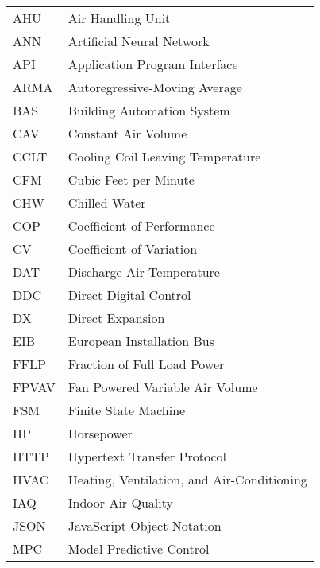 \noindent
\begin{longtable}{ll}
AHU          & Air Handling Unit\tabularnewline
ANN          & Artificial Neural Network                                 \\
API          & Application Program Interface                             \\
ARMA         & Autoregressive-Moving Average                             \\
BAS          & Building Automation System\tabularnewline
CAV          & Constant Air Volume                                       \\
CCLT         & Cooling Coil Leaving Temperature                          \\
CFM          & Cubic Feet per Minute                                     \\
CHW          & Chilled Water                                             \\
COP          & Coefficient of Performance                                \\
CV           & Coefficient of Variation                                  \\
DAT          & Discharge Air Temperature                                 \\
DDC          & Direct Digital Control                                    \\
DX           & Direct Expansion                                          \\
EIB          & European Installation Bus                                 \\
FFLP         & Fraction of Full Load Power                               \\
FPVAV        & Fan Powered Variable Air Volume                           \\
FSM          & Finite State Machine                                      \\
HP           & Horsepower                                                \\
HTTP         & Hypertext Transfer Protocol                               \\
HVAC         & Heating, Ventilation, and Air-Conditioning\tabularnewline
IAQ          & Indoor Air Quality                                        \\
JSON         & JavaScript Object Notation                                \\
MPC          & Model Predictive Control                                  \\

\end{longtable}

